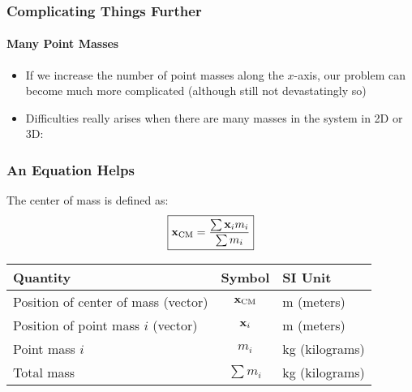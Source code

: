 \documentclass[12pt,compress,aspectratio=169]{beamer}
\newcommand{\mb}[1]{\ensuremath\mathbf{#1}}
\begin{document}
\begin{frame}
  \frametitle{Complicating Things Further}
  \framesubtitle{Many Point Masses}
  \begin{itemize}
  \item If we increase the number of point masses along the $x$-axis, our
    problem can become much more complicated (although still not devastatingly
    so)

    \vspace{0.1in}
    \begin{center}
    \end{center}

  \item Difficulties really arises when there are many masses in the system in
    2D or 3D:
    
    \vspace{-0.1in}
    \begin{center}
    \end{center}
  \end{itemize}
\end{frame}


\begin{frame}
  \frametitle{An Equation Helps}
  The center of mass is defined as:
  {\LARGE
    \begin{displaymath}
      \boxed{\mb{x}_\mathrm{CM}=\frac{\sum \mb{x}_i m_i}{\sum m_i}}
    \end{displaymath}
  }
  
  \begin{center}
    \begin{tabular}{l|c|l}
      \rowcolor{pink}
      \textbf{Quantity} & \textbf{Symbol} & \textbf{SI Unit} \\ \hline
      Position of center of mass (vector) & $\mb{x}_\mathrm{CM}$ & \si{m} (meters)\\
      Position of point mass $i$ (vector) & $\mb{x}_i$ & \si{m} (meters)\\
      Point mass $i$ & $m_i$ & \si{kg} (kilograms)\\
      Total mass & $\sum m_i$ & \si{kg} (kilograms) \\
    \end{tabular}
  \end{center}
\end{frame}
\end{document}
